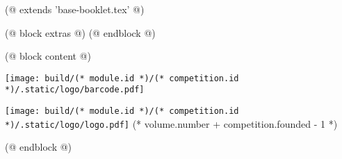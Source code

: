 (@ extends 'base-booklet.tex' @)

(@ block extras @)
(@ endblock @)

(@ block content @)
    \pagestyle{empty}
    \begin{center}
        \null
        \vfill
        \texttt{[image: build/(* module.id *)/(* competition.id *)/.static/logo/barcode.pdf]}
    \end{center}
    \newpage
    \begin{center}
        \vspace*{20mm}
        \texttt{[image: build/(* module.id *)/(* competition.id *)/.static/logo/logo.pdf]}
        \vfill
        \fontsize{60}{25}\selectfont
        (* volume.number + competition.founded - 1 *)
    \end{center}
(@ endblock @)


